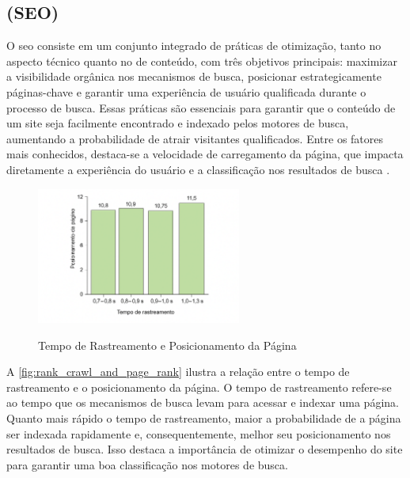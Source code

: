 \subsection{ (SEO)}
\label{sec:seo}

O \acrfull{seo} consiste em um conjunto integrado de práticas de otimização, tanto no aspecto técnico quanto no de conteúdo, com três objetivos principais: maximizar a visibilidade orgânica nos mecanismos de busca, posicionar estrategicamente páginas-chave e garantir uma experiência de usuário qualificada durante o processo de busca. Essas práticas são essenciais para garantir que o conteúdo de um site seja facilmente encontrado e indexado pelos motores de busca, aumentando a probabilidade de atrair visitantes qualificados. Entre os fatores mais conhecidos, destaca-se a velocidade de carregamento da página, que impacta diretamente a experiência do usuário e a classificação nos resultados de busca \cite{conor2022}.
\begin{figure}[H]
    \centering
    \caption{Tempo de Rastreamento e Posicionamento da Página}
    \includegraphics[width=0.6\textwidth]{media/rank_crawl_and_page_rank.png}
    \label{fig:rank_crawl_and_page_rank}
\end{figure}

A \autoref{fig:rank_crawl_and_page_rank} ilustra a relação entre o tempo de rastreamento e o posicionamento da página. O tempo de rastreamento refere-se ao tempo que os mecanismos de busca levam para acessar e indexar uma página. Quanto mais rápido o tempo de rastreamento, maior a probabilidade de a página ser indexada rapidamente e, consequentemente, melhor seu posicionamento nos resultados de busca. Isso destaca a importância de otimizar o desempenho do site para garantir uma boa classificação nos motores de busca.

\subsection{}
\label{sec:velocidade da página}

